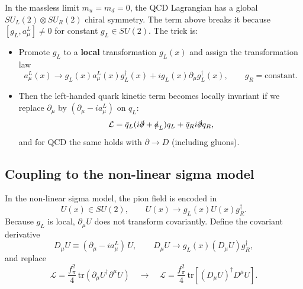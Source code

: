 In the massless limit $m_u=m_d=0$, the QCD Lagrangian has a global
$SU_L(2)\otimes SU_R(2)$ chiral symmetry. The term above breaks it because
$[g_L,a^L_\mu]\neq 0$ for constant $g_L\in SU(2)$. The trick is:
\begin{itemize}
  \item Promote $g_L$ to a \textbf{local} transformation $g_L(x)$ and assign
        the transformation law
        \begin{equation}
        a^L_\mu(x)\to g_L(x)a^L_\mu(x)g_L^\dagger(x)+i g_L(x)\partial_\mu g_L^\dagger(x),
        \qquad g_R=\text{constant}.
        \end{equation}
  \item Then the left-handed quark kinetic term becomes locally invariant if we replace
        $\partial_\mu$ by $(\partial_\mu-i a^L_\mu)$ on $q_L$:
        \begin{equation}
          \mathcal{L}=\bar q_L(i\slashed{\partial}+\slashed{a}_L)q_L+\bar q_R i\slashed{\partial} q_R,
        \end{equation}
        and for QCD the same holds with $\partial\to D$ (including gluons).
\end{itemize}

\subsection{Coupling to the non-linear sigma model}
In the non-linear sigma model, the pion field is encoded in
\begin{equation}
U(x)\in SU(2),
\qquad
U(x)\to g_L(x)U(x)g_R^\dagger.
\end{equation}
Because $g_L$ is local, $\partial_\mu U$ does not transform covariantly.
Define the covariant derivative
\begin{equation}
D_\mu U \equiv (\partial_\mu-i a^L_\mu)\,U,
\qquad
D_\mu U \to g_L(x) (D_\mu U) g_R^\dagger,
\end{equation}
and replace
\begin{equation}
\mathcal{L}=\frac{f_\pi^2}{4}\,\mathrm{tr}(\partial_\mu U^\dagger \partial^\mu U)
\quad\longrightarrow\quad
\mathcal{L}=\frac{f_\pi^2}{4}\,\mathrm{tr}\!\left[(D_\mu U)^\dagger D^\mu U\right].
\end{equation}


